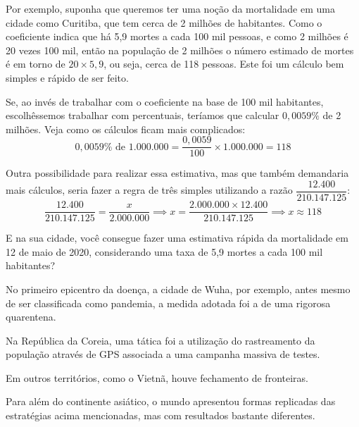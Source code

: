 Por exemplo, suponha que queremos ter uma noção da mortalidade em uma cidade como Curitiba, que tem cerca de 2 milhões de habitantes. Como o coeficiente indica que há 5,9 mortes a cada 100 mil pessoas, e como 2 milhões é 20 vezes 100 mil, então na população de 2 milhões o número estimado de mortes é em torno de $20\times5{,}9$, ou seja, cerca de 118 pessoas. Este foi um cálculo bem simples e rápido de ser feito.

Se, ao invés de trabalhar com o coeficiente na base de 100 mil habitantes, escolhêssemos trabalhar com percentuais, teríamos que calcular $0{,}0059\%$ de 2 milhões. Veja como os cálculos ficam mais complicados:
\begin{equation*}
0{,}0059\%\text{ de }1.000.000=\frac{0{,}0059}{100}\times 1.000.000=118
\end{equation*}

Outra possibilidade para realizar essa estimativa, mas que também demandaria mais cálculos, seria fazer a regra de três simples utilizando a razão $\dfrac{12.400}{210.147.125}$:
\begin{equation*}
\frac{12.400}{210.147.125}=\frac{x}{2.000.000}\implies x=\frac{2.000.000\times 12.400}{210.147.125}\implies x\approx 118
\end{equation*}

E na sua cidade, você consegue fazer uma estimativa rápida da mortalidade em 12 de maio de 2020, considerando uma taxa de 5,9 mortes a cada 100 mil habitantes?


No primeiro epicentro da doença, a cidade de Wuha, por exemplo, antes mesmo de ser classificada como pandemia, a medida adotada foi a de uma rigorosa quarentena.

Na República da Coreia, uma tática foi a utilização do rastreamento da população através de GPS associada a uma campanha massiva de testes.

Em outros territórios, como o Vietnã, houve fechamento de fronteiras.

Para além do continente asiático, o mundo apresentou formas replicadas das estratégias acima mencionadas, mas com resultados bastante diferentes.


